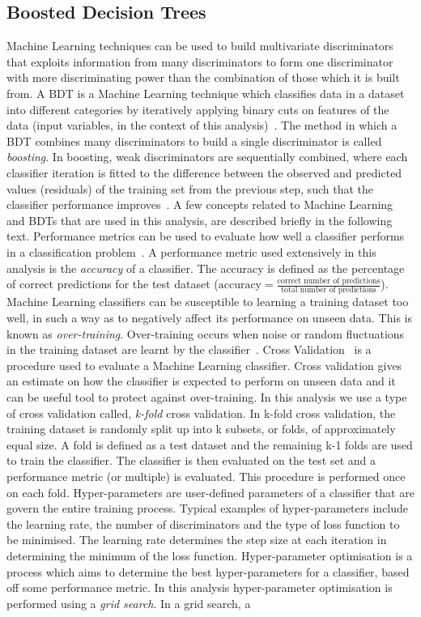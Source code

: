 \subsection{Boosted Decision Trees}
\label{sec:bdt}
Machine Learning techniques can be used to build multivariate discriminators that exploits information from many discriminators to form one discriminator with more discriminating power than the combination of those which it is built from. A BDT is a Machine Learning technique which classifies data in a dataset into different categories by iteratively applying binary cuts on features of the data (input variables, in the context of this analysis)~\cite{intro-bdt}. The method in which a BDT combines many discriminators to build a single discriminator is called \textit{boosting}. In boosting, weak discriminators are sequentially combined, where each classifier iteration is fitted to the difference between the observed and predicted values (residuals) of the training set from the previous step, such that the classifier performance improves~\cite{hastie2009the}. A few concepts related to Machine Learning and BDTs that are used in this analysis, are described briefly in the following text. Performance metrics can be used to evaluate how well a classifier performs in a classification problem~\cite{ML-metrics}. A performance metric used extensively in this analysis is the \textit{accuracy} of a classifier. The accuracy is defined as the percentage of correct predictions for the test dataset ($\text{accuracy} = \frac{\text{correct number of predictions}}{\text{total number of predictions}}$). Machine Learning classifiers can be susceptible to learning a training dataset too well, in such a way as to negatively affect its performance on unseen data. This is known as \textit{over-training}. Over-training occurs when noise or random fluctuations in the training dataset are learnt by the classifier~\cite{overfitting-blog}. Cross Validation~\cite{cv-blog} is a procedure used to evaluate a Machine Learning classifier. Cross validation gives an estimate on how the classifier is expected to perform on unseen data and it can be useful tool to protect against over-training. In this analysis we use a type of cross validation called, \textit{k-fold} cross validation. In k-fold cross validation, the training dataset is randomly split up into k subsets, or folds, of approximately equal size. A fold is defined as a test dataset and the remaining k-1 folds are used to train the classifier. The classifier is then evaluated on the test set and a performance metric (or multiple) is evaluated. This procedure is performed once on each fold. Hyper-parameters are user-defined parameters of a classifier that are govern the entire training process. Typical examples of hyper-parameters include the learning rate, the number of discriminators and the type of loss function to be minimised. The learning rate determines the step size at each iteration in determining the minimum of the loss function. Hyper-parameter optimisation is a process which aims to determine the best hyper-parameters for a classifier, based off some performance metric. In this analysis hyper-parameter optimisation is performed using a \textit{grid search}. In a grid search, a 